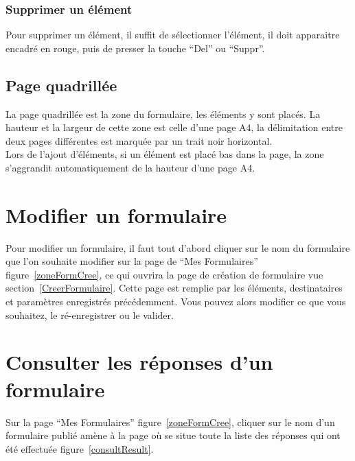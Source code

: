 \documentclass[a4paper,11pt,final]{report}
\begin{document}
\subsubsection{Supprimer un élément}
Pour supprimer un élément, il suffit de sélectionner l'élément, il doit apparaitre encadré en rouge, puis de presser la touche ``Del'' ou ``Suppr''.

\subsection{Page quadrillée}
La page quadrillée est la zone du formulaire, les éléments y sont placés. La hauteur et la largeur de cette zone est celle d'une page A4, la délimitation entre deux pages différentes est marquée par un trait noir horizontal.\\
Lors de l'ajout d'éléments, si un élément est placé bas dans la page, la zone s'aggrandit automatiquement de la hauteur d'une page A4. 

\section{Modifier un formulaire}
Pour modifier un formulaire, il faut tout d'abord cliquer sur le nom du formulaire que l'on souhaite modifier sur la page de ``Mes Formulaires'' figure~\ref{zoneFormCree}, ce qui ouvrira la page de création de formulaire vue section~\ref{CreerFormulaire}. Cette page est remplie par les éléments, destinataires et paramètres enregistrés précédemment. Vous pouvez alors modifier ce que vous souhaitez, le ré-enregistrer ou le valider.

\section{Consulter les réponses d'un formulaire}
Sur la page ``Mes Formulaires'' figure~\ref{zoneFormCree}, cliquer sur le nom d'un formulaire publié amène à la page où se situe toute la liste des réponses qui ont été effectuée figure~\ref{consultResult}.

\noindent\begin{minipage}{\linewidth}%
\label{consultResult}
\end{minipage}
\end{document}
